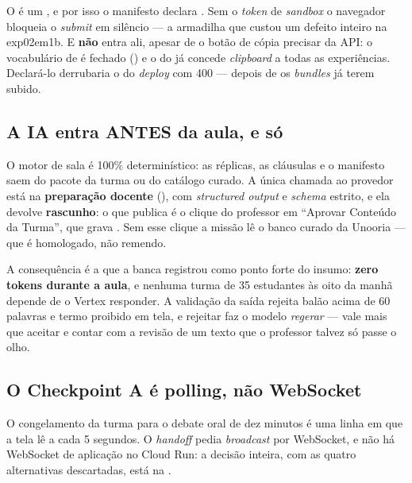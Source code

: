 \begin{atencao}
O  é um , e por isso o manifesto declara
. Sem o \emph{token} de \emph{sandbox} o navegador
bloqueia o \emph{submit} em silêncio --- a armadilha que custou um defeito
inteiro na exp02em1b. E  \textbf{não} entra ali, apesar de o
botão de cópia precisar da API: o vocabulário de  é fechado
() e o  do  já
concede \emph{clipboard} a todas as experiências. Declará-lo derrubaria o
 do \emph{deploy} com 400 --- depois de os
\emph{bundles} já terem subido.
\end{atencao}

\subsection{A IA entra ANTES da aula, e só}

O motor de sala é 100\% determinístico: as réplicas, as cláusulas e o manifesto
saem do pacote da turma ou do catálogo curado. A única chamada ao provedor está
na \textbf{preparação docente} (),
com \emph{structured output} e \emph{schema} estrito, e ela devolve
\textbf{rascunho}: o que publica é o clique do professor em \enquote{Aprovar
Conteúdo da Turma}, que grava . Sem esse clique a
missão lê o banco curado da Unooria --- que é homologado, não remendo.

A consequência é a que a banca registrou como ponto forte do insumo:
\textbf{zero tokens durante a aula}, e nenhuma turma de 35 estudantes às oito da
manhã depende de o Vertex responder. A validação da saída rejeita balão acima de
60 palavras e termo proibido em tela, e rejeitar faz o modelo \emph{regerar} ---
vale mais que aceitar e contar com a revisão de um texto que o professor talvez
só passe o olho.

\subsection{O Checkpoint A é polling, não WebSocket}

O congelamento da turma para o debate oral de dez minutos é uma linha em
 que a tela lê a cada 5 segundos. O \emph{handoff}
pedia \emph{broadcast}  por WebSocket, e não há WebSocket de
aplicação no Cloud Run: a decisão inteira, com as quatro alternativas
descartadas, está na .

